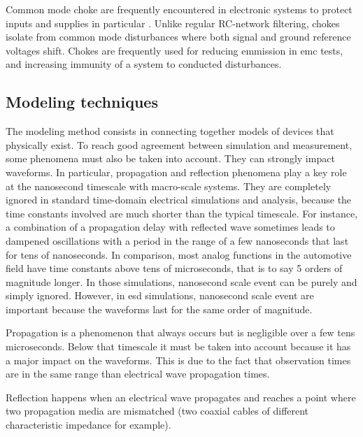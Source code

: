 Common mode choke are frequently encountered in electronic systems to protect inputs and supplies in particular \cite{cmc-for-emc-protection, cmc-esd, alternative-cmc-emi-noise}.
Unlike regular RC-network filtering, chokes isolate from common mode disturbances where both signal and ground reference voltages shift.
Chokes are frequently used for reducing emmission in \gls{emc} tests, and increasing immunity of a system to conducted disturbances.


\subsection{Modeling techniques}

The modeling method consists in connecting together models of devices that physically exist.
To reach good agreement between simulation and measurement, some phenomena must also be taken into account.
They can strongly impact waveforms.
In particular, propagation and reflection phenomena play a key role at the nanosecond timescale with macro-scale systems.
They are completely ignored in standard time-domain electrical simulations and analysis, because the time constants involved are much shorter than the typical timescale.
For instance, a combination of a propagation delay with reflected wave sometimes leads to dampened oscillations with a period in the range of a few nanoseconds that last for tens of nanoseconds.
In comparison, most analog functions in the automotive field have time constants above tens of microseconds, that is to say 5 orders of magnitude longer.
In those simulations, nanosecond scale event can be purely and simply ignored.
However, in \gls{esd} simulations, nanosecond scale event are important because the waveforms last for the same order of magnitude.

Propagation is a phenomenon that always occurs but is negligible over a few tens microseconds.
Below that timescale it must be taken into account because it has a major impact on the waveforms.
This is due to the fact that observation times are in the same range than electrical wave propagation times.

Reflection happens when an electrical wave propagates and reaches a point where two propagation media are mismatched (two coaxial cables of different characteristic impedance for example).

